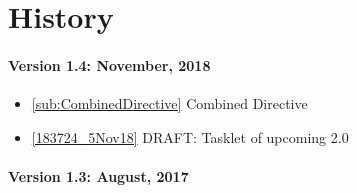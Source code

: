 \section*{History}

\paragraph*{Version 1.4: November, 2018}
\begin{itemize}
  \item \ref{sub:CombinedDirective}        Combined Directive
  \item \ref{183724_5Nov18}                DRAFT: Tasklet of upcoming
		{\XMP} 2.0
\end{itemize}

\paragraph*{Version 1.3: August, 2017}

